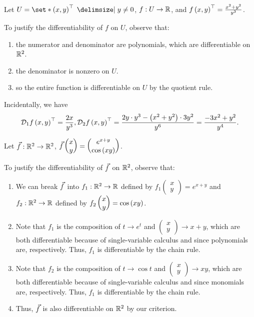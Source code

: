 \documentclass[main.tex]{subfiles}
\begin{document}
\begin{example}
    Let $U = \set*{\parens{x, y}^\top \mid y \neq 0}$, $f : U \to \mathbb R$, and $f\left( x, y \right)^\top = \frac{x^2 + y^2}{y^3}$.
\end{example}
To justify the differentiability of $f$ on $U$, observe that:
\begin{enumerate}
    \item the numerator and denominator are polynomials, which are differentiable on $\mathbb R^2$.
    \item the denominator is nonzero on $U$.
    \item so the entire function is differentiable on $U$ by the quotient rule.
\end{enumerate}
Incidentally, we have
\[\mathcal{D}_1f\left( x, y \right)^\top = \frac{2x}{y^3}, \mathcal{D}_2f\left( x, y \right)^\top = \frac{2y\cdot y^3 - \left( x^2 + y^2 \right)\cdot 3y^2}{y^6} = \frac{-3x^2 + y^2}{y^4}.\]
\begin{example}
    Let $\vec{f} : \mathbb R^2 \to \mathbb R^2$, $\vec{f}\begin{pmatrix}
        x \\ y
    \end{pmatrix} = \begin{pmatrix}
        e^{x + y} \\ \cos\left( xy \right)
    \end{pmatrix}$.
\end{example}
To justify the differentiability of $\vec{f}$ on $\mathbb R^2$, observe that:
\begin{enumerate}
    \item We can break $\vec{f}$ into $f_1 : \mathbb R^2\to \mathbb R$ defined by $f_1\begin{pmatrix}
        x \\ y
    \end{pmatrix} = e^{x + y}$ and $f_2 : \mathbb R^2 \to \mathbb R$ defined by $f_2\begin{pmatrix}
        x \\ y
    \end{pmatrix} = \cos\left( xy \right)$.
    \item Note that $f_1$ is the composition of $t\to e^t$ and $\begin{pmatrix}
        x \\ y
    \end{pmatrix}\to x + y$, which are both differentiable because of single-variable calculus and since polynomials are, respectively. Thus, $f_1$ is differentiable by the chain rule.
    \item Note that $f_2$ is the composition of $t\to \cos t$ and $\begin{pmatrix}
        x \\ y
    \end{pmatrix}\to xy$, which are both differentiable because of single-variable calculus and since monomials are, respectively. Thus, $f_1$ is differentiable by the chain rule.
    \item Thus, $\vec{f}$ is also differentiable on $\mathbb R^2$ by our criterion.
\end{enumerate}
\end{document}
